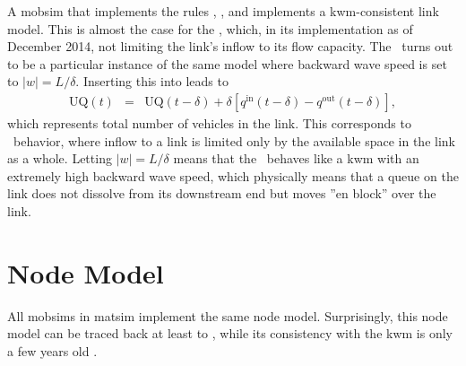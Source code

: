 A \gls{mobsim} that implements the rules ,
,  and  implements
a \gls{kwm}-consistent link model. This is almost the case for the \DOUBLEQUEUESIM,
which, in its implementation as of December 2014,  not limiting the link's inflow to its
flow capacity.
%
The \SINGLEQUEUESIM\ turns out to be a
particular instance of the same model where backward wave speed
is set to $\left|w\right|=L/\delta$. Inserting this into 
leads to
\begin{eqnarray}
\text{UQ}(t) & = & \text{UQ}(t-\delta)+\delta\left[q^{\text{in}}(t-\delta)-q^{\text{out}}(t-\delta)\right],
\end{eqnarray}
which represents  total number of vehicles in the
 link.
This corresponds to \SINGLEQUEUESIM\ behavior,
where inflow to a link is limited only by the available space
in the link as a whole. Letting $\left|w\right|=L/\delta$ means that
the \SINGLEQUEUESIM\ behaves like a \gls{kwm}\corr{,}{} with an extremely
high backward wave speed, which physically means that a queue
on the link does not dissolve from its downstream end\corr{,}{} but moves {}''en
block'' over the link. 

\section{\label{sec:Node-model}Node Model}
All \glspl{mobsim} in \gls{matsim} implement the same node model. Surprisingly,
this node model can be traced back at least to \cite[][under the name of ``fair intersections'']{CetinBurriNagel2003queue}, while
 its consistency with the
\gls{kwm} is only a few years old \citep{tampere-2010b,floetteroed-2011a,corthout-2012}. 

